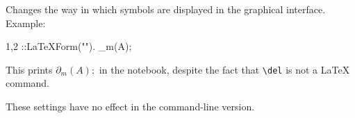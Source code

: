 
Changes the way in which symbols are displayed in the graphical
interface. Example:
\begin{screen}{1,2}
\del{#}::LaTeXForm("\partial").
\del_{m}(A);
\end{screen}
This prints $\partial_{m}(A);$ in the notebook, despite the fact
that \verb|\del| is not a \LaTeX{} command.

These settings have no effect in the command-line version.

